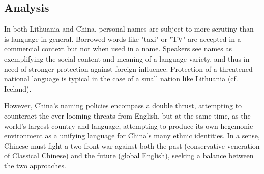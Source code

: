 \subsection{Analysis}

In both Lithuania and China, personal names are subject to more scrutiny than
is language in general. Borrowed words like "taxi" or "TV" are accepted in a
commercial context but not when used in a name. Speakers see names as
exemplifying the social content and meaning of a language variety, and thus in
need of stronger protection against foreign influence. Protection of a
threatened national language is typical in the case of a small nation like
Lithuania (cf. Iceland).

However, China's naming policies encompass a double thrust, attempting to
counteract the ever-looming threats from English, but at the same time, as the
world's largest country and language, attempting to produce its own hegemonic
environment as a unifying language for China's many ethnic identities. In a
sense, Chinese must fight a two-front war against both the past (conservative
veneration of Classical Chinese) and the future (global English), seeking a
balance between the two approaches.
